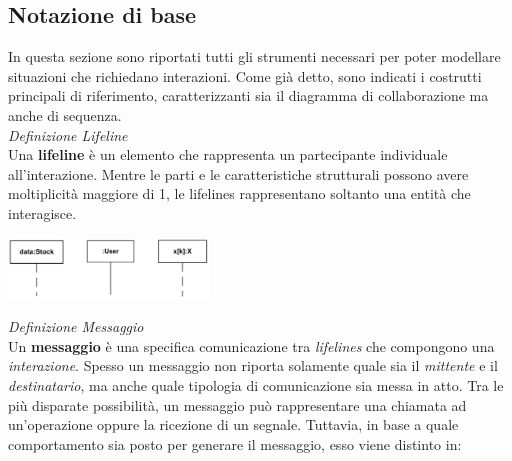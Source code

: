 \documentclass{article}
\begin{document}
\subsection*{Notazione di base}
\large
In questa sezione sono riportati tutti gli strumenti necessari per poter modellare situazioni che richiedano interazioni. Come già detto, sono indicati i costrutti principali di riferimento, caratterizzanti sia il diagramma di collaborazione ma anche di sequenza.\vspace*{14pt}\\
\textit{Definizione Lifeline}\\
Una \textbf{lifeline} è un elemento che rappresenta un partecipante individuale all'interazione. Mentre le parti e le caratteristiche strutturali possono avere moltiplicità maggiore di 1, le lifelines rappresentano soltanto una entità che interagisce.\vspace*{14pt}
\begin{center}
    \includegraphics[width=0.4\textwidth]{foto 3.png}
\end{center}
\textit{Definizione Messaggio}\\
Un \textbf{messaggio} è una specifica comunicazione tra \textit{lifelines} che compongono una \textit{interazione}. Spesso un messaggio non riporta solamente quale sia il \textit{mittente} e il \textit{destinatario}, ma anche quale tipologia di comunicazione sia messa in atto. Tra le più disparate possibilità, un messaggio può rappresentare una chiamata ad un'operazione oppure la ricezione di un segnale. Tuttavia, in base a quale comportamento sia posto per generare il messaggio, esso viene distinto in:
\end{document}
